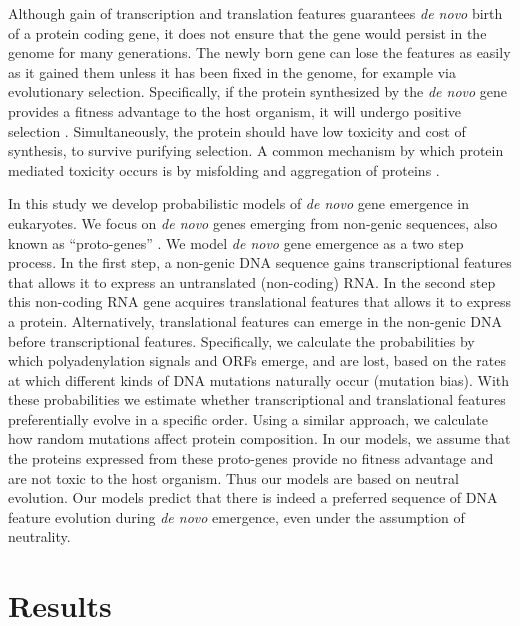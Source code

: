 \documentclass[12pt,a4paper]{article}
\newcommand{\cmnt}[1]{{\color{purple} #1}}
\begin{document}
Although gain of transcription and translation features guarantees \textit{de novo} birth of a protein coding gene, it does not ensure that the gene would persist in the genome for many generations. The newly born gene can lose the features as easily as it gained them unless it has been fixed in the genome, for example via evolutionary selection. Specifically, if the protein synthesized by the \textit{de novo} gene provides a fitness advantage to the host organism, it will undergo positive selection \citep{deNovoFunction}. Simultaneously, the protein should have low toxicity and cost of synthesis, to survive purifying selection. A common mechanism by which protein mediated toxicity occurs is by misfolding and aggregation of proteins \citep{misfold1,misfold2}.

In this study we develop probabilistic models of \textit{de novo} gene emergence \cmnt{in eukaryotes}. We focus on \textit{de novo} genes emerging from non-genic sequences, also known as ``proto-genes'' \citep{protogenes,vanOss}. We model \textit{de novo} gene emergence as a two step process. In the first step, a non-genic DNA sequence gains transcriptional features that allows it to express an untranslated (non-coding) RNA. In the second step this non-coding RNA gene acquires translational features that allows it to express a protein. Alternatively, translational features can emerge in the non-genic DNA before transcriptional features. Specifically, we calculate the probabilities by which polyadenylation signals and ORFs emerge, and are lost, based on the rates at which different kinds of DNA mutations naturally occur (mutation bias). With these probabilities we estimate whether transcriptional and translational features preferentially evolve in a specific order. Using a similar approach, we calculate how random mutations affect protein composition. In our models, we assume that the proteins expressed from these proto-genes provide no fitness advantage and are not toxic to the host organism. Thus our models are based on neutral evolution. Our models predict that there is indeed a preferred sequence of DNA feature evolution during \textit{de novo} emergence, even under the assumption of neutrality.

\section{Results}
\end{document}
